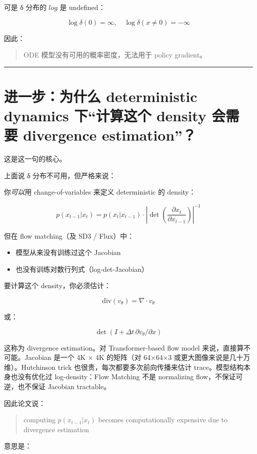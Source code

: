 可是 δ 分布的 \(log\) 是 undefined：

\[
\log \delta(0) = \infty, \quad \log \delta(x\neq 0) = -\infty
\]

因此：

\begin{quote}
ODE 模型没有可用的概率密度，无法用于 policy gradient。
\end{quote}

\hrule

\section{进一步：为什么 deterministic dynamics 下“计算这个 density 会需要 divergence estimation”？}

这是这一句的核心。

上面说 δ 分布不可用，但严格来说：

你\emph{可以}用 change-of-variables 来定义 deterministic 的 density：

\[
p(x_{t-1}|x_t) = p(x_t|x_{t-1}) \cdot \left|\det\left(\frac{\partial x_t}{\partial x_{t-1}}\right)\right|^{-1}
\]

但在 flow matching（及 SD3 / Flux）中：

\begin{itemize}
  \item 模型从来没有训练过这个 Jacobian
  \item 也没有训练对数行列式（log-det-Jacobian）
\end{itemize}

要计算这个 density，你必须估计：

\[
\text{div}(v_\theta) = \nabla \cdot v_\theta
\]

或：

\[
\det\left(I + \Delta t \, \partial v_\theta / \partial x\right)
\]

这称为 divergence estimation。对 Transformer-based flow model 来说，直接算不可能。Jacobian 是一个 4K × 4K 的矩阵（对 64×64×3 或更大图像来说是几十万维）。Hutchinson trick 也很贵，每次都要多次前向传播来估计 trace。模型结构本身也没有优化过 log-density：Flow Matching 不是 normalizing flow，不保证可逆，也不保证 Jacobian tractable。

因此论文说：

\begin{quote}
computing \(p(x_{t−1} | x_t)\) becomes computationally expensive due to divergence estimation
\end{quote}

意思是：


